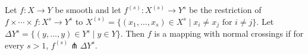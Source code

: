 Let $f: X \to Y$ be smooth and let $f^{(s)}: X^{(s)} \to Y^s$ be the restriction of $f \times \cdots \times f: X^s \to Y^s$ to $X^{(s)} = \{ (x_1, \ldots, x_s) \in X^s \mid x_i \neq x_j \text{ for } i \neq j \}$. Let $\Delta Y^s = \{ (y, \ldots, y) \in Y^s \mid y \in Y \}$. Then $f$ is a mapping with normal crossings if for every $s > 1$, $f^{(s)} \pitchfork \Delta Y^s$.
